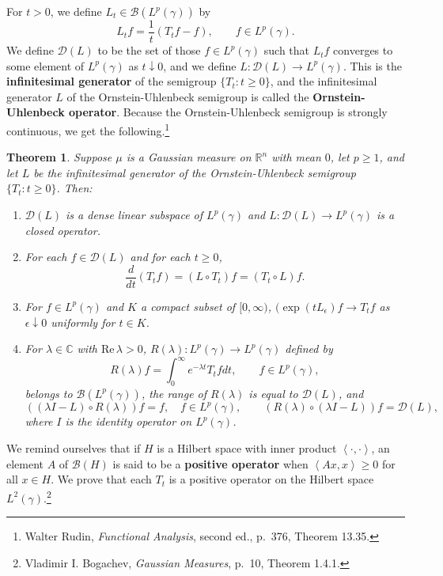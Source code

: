 \documentclass{article}
\newcommand{\inner}[2]{\left\langle #1, #2 \right\rangle}
\def\Re{\ensuremath{\mathrm{Re}}\,}
\newtheorem{theorem}{Theorem}
\theoremstyle{definition}
\begin{document}
For $t >0$, we define $L_t \in \mathscr{B}(L^p(\gamma))$ by 
\[
L_t f =\frac{1}{t}(T_t f -f), \qquad f \in L^p(\gamma).
\]
We define $\mathscr{D}(L)$ to be the set of those $f \in L^p(\gamma)$ such that $L_t f$ converges to
some element of $L^p(\gamma)$ as $t \downarrow 0$,
and we define 
$L:\mathscr{D}(L) \to L^p(\gamma)$. This is the \textbf{infinitesimal generator} of the semigroup $\{T_t: t \geq 0\}$, and the infinitesimal generator $L$ of the 
Ornstein-Uhlenbeck semigroup is called the \textbf{Ornstein-Uhlenbeck operator}.
Because the Ornstein-Uhlenbeck semigroup is strongly continuous, we get the following.\footnote{Walter Rudin, {\em Functional Analysis},
second ed., p.~376, Theorem 13.35.} 

\begin{theorem}
Suppose $\mu$ is a Gaussian measure on $\mathbb{R}^n$ with mean $0$, let $p\geq 1$, and let 
$L$ be the infinitesimal generator of the Ornstein-Uhlenbeck semigroup $\{T_t:t \geq 0\}$. Then:
\begin{enumerate}
\item $\mathscr{D}(L)$ is a dense linear subspace of $L^p(\gamma)$ and $L:\mathscr{D}(L) \to L^p(\gamma)$ is a closed operator.
\item For each $f \in \mathscr{D}(L)$ and for each $t \geq 0$,
\[
\frac{d}{dt} (T_tf) = (L \circ T_t) f = (T_t \circ L) f.
\]
\item For $f \in L^p(\gamma)$ and $K$ a compact subset of $[0,\infty)$, 
$(\exp(t L_\epsilon)f \to T_t f$ as $\epsilon \downarrow 0$ uniformly for $t \in K$. 
\item For $\lambda \in \mathbb{C}$ with $\Re \lambda>0$, $R(\lambda):L^p(\gamma) \to L^p(\gamma)$ defined by
\[
R(\lambda)f = \int_0^\infty e^{-\lambda t} T_t f dt, \qquad f \in L^p(\gamma),
\]
belongs to $\mathscr{B}(L^p(\gamma))$, the range of $R(\lambda)$ is equal to $\mathscr{D}(L)$, and
\[
((\lambda I-L) \circ R(\lambda))f = f, \quad f \in L^p(\gamma),
\qquad (R(\lambda) \circ (\lambda I-L))f = \mathscr{D}(L),
\]
where $I$ is the identity operator on $L^p(\gamma)$. 
\end{enumerate}
\label{generator}
\end{theorem}



We remind ourselves that if $H$ is a Hilbert space with inner product $\inner{\cdot}{\cdot}$,
an element $A$ of $\mathscr{B}(H)$ is said to be a \textbf{positive operator} when
$\inner{Ax}{x} \geq 0$ for all $x \in H$.
We prove that each $T_t$ is a positive operator on the Hilbert space $L^2(\gamma)$.\footnote{Vladimir I. Bogachev,
{\em Gaussian Measures}, p.~10, Theorem 1.4.1.}
\end{document}

